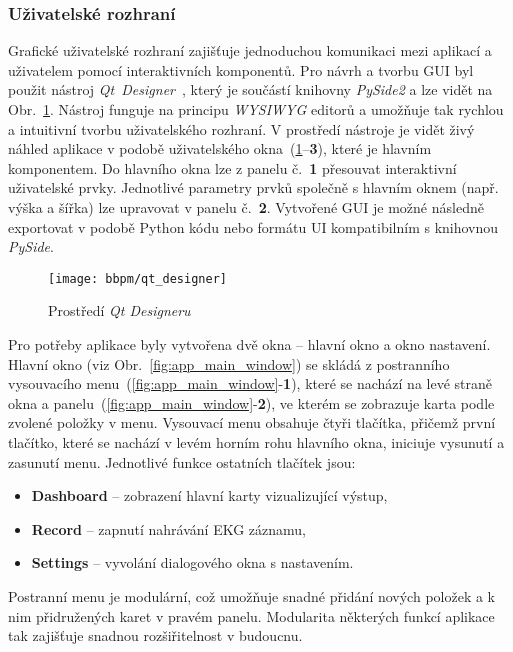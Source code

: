 \subsubsection{Uživatelské rozhraní}
\label{section:gui}
Grafické uživatelské rozhraní zajišťuje jednoduchou komunikaci mezi aplikací a
uživatelem pomocí interaktivních komponentů. Pro návrh a tvorbu GUI byl použit
nástroj \textit{Qt~Designer}~\cite{QtDesigner}, který je součástí knihovny
\textit{PySide2} a lze vidět na Obr.~\ref{fig:qt_designer}. Nástroj funguje na
principu \textit{WYSIWYG} editorů a umožňuje tak rychlou a intuitivní tvorbu
uživatelského rozhraní. V prostředí nástroje je vidět živý náhled aplikace v
podobě uživatelského okna~(\ref{fig:qt_designer}--\textbf{3}), které je hlavním
komponentem. Do hlavního okna lze z panelu č.~\textbf{1} přesouvat interaktivní
uživatelské prvky. Jednotlivé parametry prvků společně s hlavním oknem (např.
výška a šířka) lze upravovat v panelu č.~\textbf{2}. Vytvořené GUI je možné
následně exportovat v podobě Python kódu nebo formátu UI kompatibilním s knihovnou 
\textit{PySide}.

\begin{figure}[h]
    \begin{center}
        \texttt{[image: bbpm/qt\_designer]}
        \caption{Prostředí \textit{Qt Designeru}}
        \label{fig:qt_designer}
    \end{center}
\end{figure}

\clearpage

Pro potřeby aplikace byly vytvořena dvě okna -- hlavní okno a okno nastavení.
Hlavní okno (viz Obr.~\ref{fig:app_main_window}) se skládá z postranního
vysouvacího menu~(\ref{fig:app_main_window}-\textbf{1}), které se nachází na
levé straně okna a panelu~(\ref{fig:app_main_window}-\textbf{2}), ve kterém se
zobrazuje karta podle zvolené položky v menu. Vysouvací menu obsahuje čtyři
tlačítka, přičemž první tlačítko, které se nachází v levém horním rohu hlavního
okna, iniciuje vysunutí a zasunutí menu. Jednotlivé funkce ostatních tlačítek
jsou:
\begin{itemize}[noitemsep]
    \item \textbf{Dashboard} -- zobrazení hlavní karty vizualizující výstup,
    \item \textbf{Record} -- zapnutí nahrávání EKG záznamu,
    \item \textbf{Settings} -- vyvolání dialogového okna s nastavením.
\end{itemize}
Postranní menu je modulární, což umožňuje snadné přidání nových položek a k nim
přidružených karet v pravém panelu. Modularita některých funkcí aplikace tak
zajišťuje snadnou rozšiřitelnost v budoucnu.

